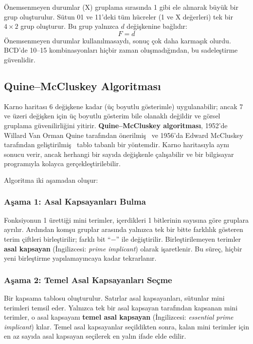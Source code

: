 \begin{ornek}[B.7]
Önemsenmeyen durumlar (X) gruplama sırasında 1 gibi ele alınarak büyük bir grup oluşturulur. Sütun 01 ve 11'deki tüm hücreler (1 ve X değerleri) tek bir $4 \times 2$ grup oluşturur. Bu grup yalnızca $d$ değişkenine bağlıdır:
\[
F = d
\]
Önemsenmeyen durumlar kullanılmasaydı, sonuç çok daha karmaşık olurdu. BCD'de 10--15 kombinasyonları hiçbir zaman oluşmadığından, bu sadeleştirme güvenlidir.
\end{ornek}



\subsection{Quine--McCluskey Algoritması}

Karno haritası 6 değişkene kadar (üç boyutlu gösterimle) uygulanabilir; ancak 7 ve üzeri değişken için üç boyutlu gösterim bile olanaklı değildir ve görsel gruplama güvenilirliğini yitirir. \textbf{Quine--McCluskey algoritması}, 1952'de Willard Van Orman Quine tarafından önerilmiş~\cite{quine1952} ve 1956'da Edward McCluskey tarafından geliştirilmiş~\cite{mccluskey1956} tablo tabanlı bir yöntemdir. Karno haritasıyla aynı sonucu verir, ancak herhangi bir sayıda değişkenle çalışabilir ve bir bilgisayar programıyla kolayca gerçekleştirilebilir.

Algoritma iki aşamadan oluşur:

\subsubsection{Aşama 1: Asal Kapsayanları Bulma}
Fonksiyonun 1 ürettiği mini terimler, içerdikleri 1 bitlerinin sayısına göre gruplara ayrılır. Ardından komşu gruplar arasında yalnızca tek bir bitte farklılık gösteren terim çiftleri birleştirilir; farklı bit ``$-$'' ile değiştirilir. Birleştirilemeyen terimler \textbf{asal kapsayan} (İngilizcesi: \textit{prime implicant}) olarak işaretlenir. Bu süreç, hiçbir yeni birleştirme yapılamayıncaya kadar tekrarlanır.

\subsubsection{Aşama 2: Temel Asal Kapsayanları Seçme}
Bir kapsama tablosu oluşturulur. Satırlar asal kapsayanları, sütunlar mini terimleri temsil eder. Yalnızca tek bir asal kapsayan tarafından kapsanan mini terimler, o asal kapsayanı \textbf{temel asal kapsayan} (İngilizcesi: \textit{essential prime implicant}) kılar. Temel asal kapsayanlar seçildikten sonra, kalan mini terimler için en az sayıda asal kapsayan seçilerek en yalın ifade elde edilir.

